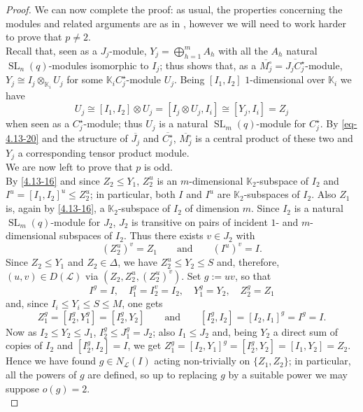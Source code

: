 \documentclass{amsart}
\numberwithin{equation}{section}
\theoremstyle{definition}
\theoremstyle{subresult}
\theoremstyle{caseresult}
\newcommand{\bK}{\mathbb{K}}
\renewcommand{\L}{\mathcal{L}}
\newcommand{\SL}{\operatorname{SL}}
\newcommand{\ov}{\overline}
\newcommand{\<}{\langle}
\renewcommand{\>}{\rangle}
\begin{document}
\begin{proof}
	We can now complete the proof: as usual, the properties concerning the modules and related arguments are as in \cite[Lemma 4.13]{Meier-Stell-Stroth:2012}, however we will need to work harder to prove that $p \ne 2$.\\
	Recall that, seen as a $J_j$-module, $Y_j = \bigoplus_{h=1}^m A_h$ with all the $A_h$ natural $\SL_n(q)$-modules isomorphic to $I_j$; thus \cite[Lemma 5.2]{MS:2008} shows that, as a $\ov{M_j^\circ}=\ov{J_jC_j^\star}$-module, $Y_j \cong I_j \otimes_{\bK_i} U_j$ for some $\bK_i C_j^\star$-module $U_j$. Being $[I_1,I_2]$ $1$-dimensional over $\bK_i$ we have
	\[
	U_j \cong [I_1,I_2] \otimes U_j = [I_j \otimes U_j, I_i] \cong [Y_j,I_i] =Z_j
	\]
	when seen as a $C_j^\star$-module; thus $U_j$ is a natural $\SL_m(q)$-module for $C_j^\star$. By \eqref{eq-4.13-20} and the structure of $\ov{J_j}$ and $\ov{C_j^\star}$, $\ov{M_j^\circ}$ is a central product of these two and $Y_j$ a corresponding tensor product module.\\
	
	We are now left to prove that $p$ is odd.\\
	By \eqref{4.13-16} and since $Z_2 \le Y_1$, $Z_2^u$ is an $m$-dimensional $\bK_2$-subspace of $I_2$ and $I^u = [I_1,I_2]^u \le Z_2^u$; in particular, both $I$ and $I^u$ are $\bK_2$-subspaces of $I_2$. Also $Z_1$ is, again by \eqref{4.13-16}, a $\bK_2$-subspace of $I_2$ of dimension $m$. Since $I_2$ is a natural $\SL_m(q)$-module for $J_2$, $J_2$ is transitive on pairs of incident $1$- and $m$-dimensional subspaces of $I_2$. Thus there exists $v \in J_2$ with
	\[
	(Z_2^u)^v = Z_1 \qquad \text{and} \qquad (I^u)^v = I.
	\]
	Since $Z_2 \le Y_1$ and $Z_2 \in \Delta$, we have $Z_2^u \le Y_2  \le S$ and, therefore, $(u,v) \in D(\L)$ via $(Z_2,Z_2^u, (Z_2^u)^v)$. Set $g:=uv$, so that
	\[
	I^g=I, \quad I_1^g = I_2^v = I_2, \quad Y_1^g = Y_2, \quad Z_2^g=Z_1
	\]
	and, since $I_i \le Y_i \le S \le M$, one gets
	\[
	Z_1^g = [I_2^g,Y_1^g] = [I_2^g, Y_2] \qquad \text{and} \qquad [I_2^g,I_2] = [I_2,I_1]^g = I^g =I.
	\]
	Now as $I_2 \le Y_2 \le J_1$, $I_2^g \le J_1^g=J_2$; also $I_1 \le J_2$ and, being $Y_2$ a direct sum of copies of $I_2$ and $[I_2^g,I_2]=I$, we get $Z_1^g = [I_2,Y_1]^g =[I_2^g,Y_2] = [I_1,Y_2] = Z_2$. Hence we have found $g \in N_\L(I)$ acting non-trivially on $\{Z_1,Z_2\}$; in particular, all the powers of $g$ are defined, so up to replacing $g$ by a suitable power we may suppose $o(g)=2$.\\
	

\end{proof}
\end{document}
